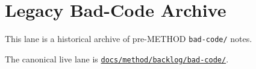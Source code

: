 \chapter{Legacy Bad-Code Archive}\label{record-388}

\smallskip

This lane is a historical archive of pre-METHOD \texttt{b\allowbreak{}a\allowbreak{}d\allowbreak{}-\allowbreak{}c\allowbreak{}o\allowbreak{}d\allowbreak{}e\allowbreak{}/} notes.

The canonical live lane is \href{https://github.com/flyingrobots/bijou/blob/cbd70612140e7a450d764b3c7be1c6af878b99bc/docs/method/graveyard/method/backlog/bad-code/README.md}{\texttt{d\allowbreak{}o\allowbreak{}c\allowbreak{}s\allowbreak{}/\allowbreak{}m\allowbreak{}e\allowbreak{}t\allowbreak{}h\allowbreak{}o\allowbreak{}d\allowbreak{}/\allowbreak{}b\allowbreak{}a\allowbreak{}c\allowbreak{}k\allowbreak{}l\allowbreak{}o\allowbreak{}g\allowbreak{}/\allowbreak{}b\allowbreak{}a\allowbreak{}d\allowbreak{}-\allowbreak{}c\allowbreak{}o\allowbreak{}d\allowbreak{}e\allowbreak{}/}}.

